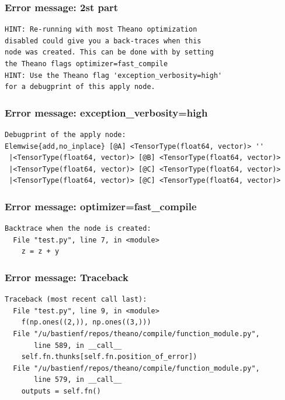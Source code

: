 \documentclass[utf8x,xcolor=pdftex,dvipsnames,table]{beamer}
\begin{document}
\begin{frame}[fragile]
  \frametitle{Error message: 2st part}

\begin{lstlisting}
HINT: Re-running with most Theano optimization
disabled could give you a back-traces when this
node was created. This can be done with by setting
the Theano flags optimizer=fast_compile
HINT: Use the Theano flag 'exception_verbosity=high'
for a debugprint of this apply node.
\end{lstlisting}
\end{frame}

\begin{frame}[fragile]
  \frametitle{Error message: exception\_verbosity=high}

\begin{lstlisting}
Debugprint of the apply node:
Elemwise{add,no_inplace} [@A] <TensorType(float64, vector)> ''
 |<TensorType(float64, vector)> [@B] <TensorType(float64, vector)>
 |<TensorType(float64, vector)> [@C] <TensorType(float64, vector)>
 |<TensorType(float64, vector)> [@C] <TensorType(float64, vector)>

\end{lstlisting}
\end{frame}

\begin{frame}[fragile]
  \frametitle{Error message: optimizer=fast\_compile}

\begin{lstlisting}
Backtrace when the node is created:
  File "test.py", line 7, in <module>
    z = z + y

\end{lstlisting}
\end{frame}

\begin{frame}[fragile]
  \frametitle{Error message: Traceback}

\begin{lstlisting}
Traceback (most recent call last):
  File "test.py", line 9, in <module>
    f(np.ones((2,)), np.ones((3,)))
  File "/u/bastienf/repos/theano/compile/function_module.py",
       line 589, in __call__
    self.fn.thunks[self.fn.position_of_error])
  File "/u/bastienf/repos/theano/compile/function_module.py",
       line 579, in __call__
    outputs = self.fn()

\end{lstlisting}
\end{frame}
\end{document}
